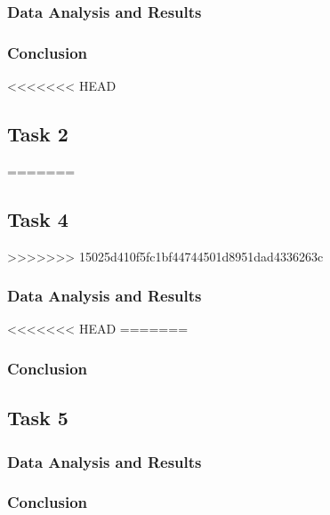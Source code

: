 \documentclass[a4paper]{article}
\begin{document}
\subsubsection{Data Analysis and Results}

\subsubsection{Conclusion}

<<<<<<< HEAD
\subsection{Task 2}
=======
\subsection{Task 4}
>>>>>>> 15025d410f5fc1bf44744501d8951dad4336263c

\subsubsection{Data Analysis and Results}
<<<<<<< HEAD
=======

\subsubsection{Conclusion}

\subsection{Task 5}

\subsubsection{Data Analysis and Results}

\subsubsection{Conclusion}
\end{document}
